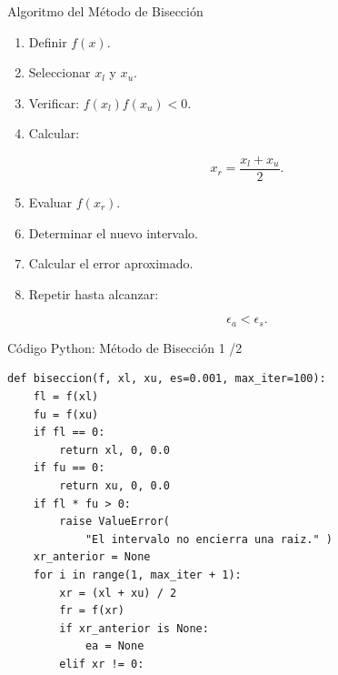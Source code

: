 \documentclass[../../main.tex]{subfiles}
\begin{document}

\begin{frame}{Algoritmo del Método de Bisección}

\begin{enumerate}

    \item Definir \(f(x)\).

    \item Seleccionar \(x_l\) y \(x_u\).

    \item Verificar: \(
    f(x_l)f(x_u)<0.
    \)

    \item Calcular:

    \[
    x_r=
    \frac{x_l+x_u}{2}.
    \]

    \item Evaluar \(f(x_r)\).

    \item Determinar el nuevo intervalo.

    \item Calcular el error aproximado.

    \item Repetir hasta alcanzar:

    \[
    \epsilon_a<\epsilon_s.
    \]

\end{enumerate}

\end{frame}



\begin{frame}[fragile]{Código Python: Método de Bisección 1 /2}

\scriptsize

\begin{lstlisting}[style=mypython]
def biseccion(f, xl, xu, es=0.001, max_iter=100):
    fl = f(xl)
    fu = f(xu)
    if fl == 0:
        return xl, 0, 0.0
    if fu == 0:
        return xu, 0, 0.0
    if fl * fu > 0:
        raise ValueError(
            "El intervalo no encierra una raiz." )
    xr_anterior = None
    for i in range(1, max_iter + 1):
        xr = (xl + xu) / 2
        fr = f(xr)
        if xr_anterior is None:
            ea = None
        elif xr != 0:
\end{lstlisting}

\end{frame}
\end{document}
